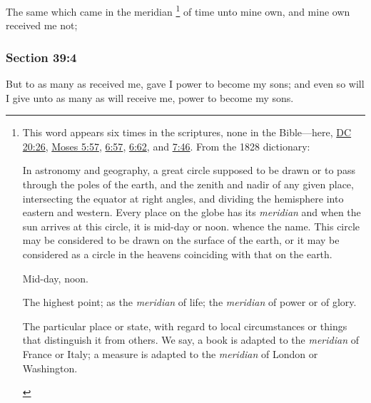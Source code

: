 		The same which came in the meridian%
			\footnote{%
				This word appears six times in the scriptures, none in the Bible---here, \hyperref[DC20-26]{DC 20:26}, \hyperref[MOSES-5-57]{Moses 5:57}, \hyperref[MOSES-6-57]{6:57}, \hyperref[MOSES-6-62]{6:62}, and \hyperref[MOSES-7-46]{7:46}. From the 1828 dictionary:
					\begin{compactitem}
						\item[1]  In astronomy and geography, a great circle supposed to be drawn or to pass through the poles of the earth, and the zenith and nadir of any given place, intersecting the equator at right angles, and dividing the hemisphere into eastern and western. Every place on the globe has its \textit{meridian} and when the sun arrives at this circle, it is mid-day or noon. whence the name. This circle may be considered to be drawn on the surface of the earth, or it may be considered as a circle in the heavens coinciding with that on the earth.
						\item[2] Mid-day, noon.
						\item[3] The highest point; as the \textit{meridian} of life; the \textit{meridian} of power or of glory.
						\item[4] The particular place or state, with regard to local circumstances or things that distinguish it from others. We say, a book is adapted to the \textit{meridian} of France or Italy; a measure is adapted to the \textit{meridian} of London or Washington.
					\end{compactitem}
				}
		of time unto mine own, and mine own received me not;


	\subsubsection{Section 39:4} %
		\label{DC39-4}

		But to as many as received me, gave I power to become my sons; and even so will I give unto as many as will receive me, power to become my sons.

